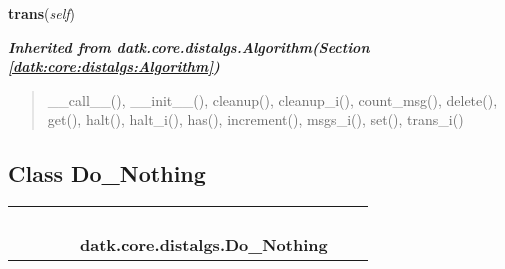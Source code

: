     \label{datk:core:distalgs:Synchronous_Algorithm:trans}

    \vspace{0.5ex}

\hspace{.8\funcindent}\begin{boxedminipage}{\funcwidth}

    \raggedright \textbf{trans}(\textit{self})

\setlength{\parskip}{2ex}
\setlength{\parskip}{1ex}
    \end{boxedminipage}


\large{\textbf{\textit{Inherited from datk.core.distalgs.Algorithm\textit{(Section \ref{datk:core:distalgs:Algorithm})}}}}

\begin{quote}
\_\_call\_\_(), \_\_init\_\_(), cleanup(), cleanup\_i(), count\_msg(), delete(), get(), halt(), halt\_i(), has(), increment(), msgs\_i(), set(), trans\_i()
\end{quote}


\subsection{Class Do\_Nothing}

    \label{datk:core:distalgs:Do_Nothing}
\begin{tabular}{cccccccc}
\multicolumn{2}{r}{\settowidth{\BCL}{datk.core.distalgs.Algorithm}\multirow{2}{\BCL}{datk.core.distalgs.Algorithm}}
&&
&&
  \\\cline{3-3}
  &&\multicolumn{1}{c|}{}
&&
&&
  \\
\multicolumn{4}{r}{\settowidth{\BCL}{datk.core.distalgs.Synchronous\_Algorithm}\multirow{2}{\BCL}{datk.core.distalgs.Synchronous\_Algorithm}}
&&
  \\\cline{5-5}
  &&&&\multicolumn{1}{c|}{}
&&
  \\
&&&&\multicolumn{2}{l}{\textbf{datk.core.distalgs.Do\_Nothing}}
\end{tabular}


